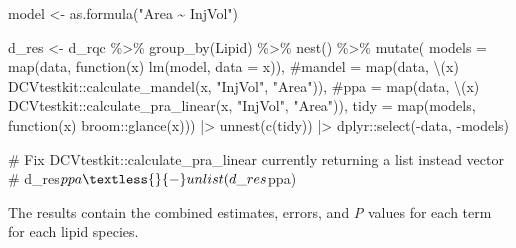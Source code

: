 \documentclass[
  letterpaper,
  DIV=11,
  numbers=noendperiod]{scrreprt}
\newenvironment{Shaded}{\begin{snugshade}}{\end{snugshade}}
\newcommand{\AttributeTok}[1]{\textcolor[rgb]{0.40,0.45,0.13}{#1}}
\newcommand{\CommentTok}[1]{\textcolor[rgb]{0.37,0.37,0.37}{#1}}
\newcommand{\ControlFlowTok}[1]{\textcolor[rgb]{0.00,0.23,0.31}{#1}}
\newcommand{\FunctionTok}[1]{\textcolor[rgb]{0.28,0.35,0.67}{#1}}
\newcommand{\NormalTok}[1]{\textcolor[rgb]{0.00,0.23,0.31}{#1}}
\newcommand{\OtherTok}[1]{\textcolor[rgb]{0.00,0.23,0.31}{#1}}
\newcommand{\SpecialCharTok}[1]{\textcolor[rgb]{0.37,0.37,0.37}{#1}}
\newcommand{\StringTok}[1]{\textcolor[rgb]{0.13,0.47,0.30}{#1}}
\begin{document}
\begin{Shaded}
\begin{Highlighting}[]
\NormalTok{model }\OtherTok{\textless{}{-}} \FunctionTok{as.formula}\NormalTok{(}\StringTok{"Area \textasciitilde{} InjVol"}\NormalTok{)}

\NormalTok{d\_res }\OtherTok{\textless{}{-}}\NormalTok{ d\_rqc }\SpecialCharTok{\%\textgreater{}\%}
  \FunctionTok{group\_by}\NormalTok{(Lipid) }\SpecialCharTok{\%\textgreater{}\%}
  \FunctionTok{nest}\NormalTok{() }\SpecialCharTok{\%\textgreater{}\%}
  \FunctionTok{mutate}\NormalTok{(}
    \AttributeTok{models =} \FunctionTok{map}\NormalTok{(data, }\ControlFlowTok{function}\NormalTok{(x) }\FunctionTok{lm}\NormalTok{(model, }\AttributeTok{data =}\NormalTok{ x)), }
    \CommentTok{\#mandel = map(data, \textbackslash{}(x) DCVtestkit::calculate\_mandel(x, "InjVol", "Area")),}
    \CommentTok{\#ppa = map(data, \textbackslash{}(x) DCVtestkit::calculate\_pra\_linear(x, "InjVol", "Area")),}
    \AttributeTok{tidy =} \FunctionTok{map}\NormalTok{(models, }\ControlFlowTok{function}\NormalTok{(x) broom}\SpecialCharTok{::}\FunctionTok{glance}\NormalTok{(x))) }\SpecialCharTok{|\textgreater{}} 
  \FunctionTok{unnest}\NormalTok{(}\FunctionTok{c}\NormalTok{(tidy)) }\SpecialCharTok{|\textgreater{}} 
\NormalTok{  dplyr}\SpecialCharTok{::}\FunctionTok{select}\NormalTok{(}\SpecialCharTok{{-}}\NormalTok{data, }\SpecialCharTok{{-}}\NormalTok{models)}

\CommentTok{\# Fix DCVtestkit::calculate\_pra\_linear currently returning a list instead vector}
\CommentTok{\# d\_res$ppa \textless{}{-} unlist(d\_res$ppa)}
\end{Highlighting}
\end{Shaded}

The results contain the combined estimates, errors, and \emph{P} values
for each term for each lipid species.
\end{document}
